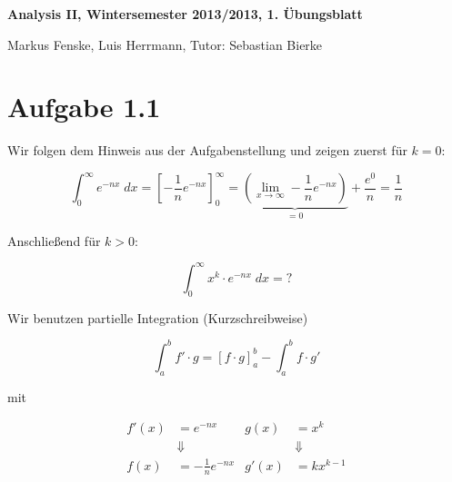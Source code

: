 \documentclass[a4paper,german,12pt,smallheadings]{scrartcl}
\begin{document}
\begin{center}
\bfseries %
\sffamily %
\vspace{-40pt}
Analysis II, Wintersemester 2013/2013, 1. Übungsblatt

Markus Fenske, Luis Herrmann, Tutor: Sebastian Bierke
\vspace{-10pt}
\end{center}

\section*{Aufgabe 1.1}

%


Wir folgen dem Hinweis aus der Aufgabenstellung und zeigen zuerst für $k=0$:

\begin{equation*}
  \int_0^\infty e^{-nx} \; dx = \left[ -\frac{1}{n} e^{-nx} \right]_0^\infty = \underbrace{\left(\lim_{x \to \infty} - \frac{1}{n} e^{-nx} \right)}_{=0} + \frac{e^0}{n} = \frac{1}{n}
\end{equation*}

Anschließend für $k > 0$:

\begin{equation*}
  \int_0^\infty x^k \cdot e^{-nx} \; dx = \text{?}
\end{equation*}

Wir benutzen partielle Integration (Kurzschreibweise)

\begin{equation*}
  \int_a^b f' \cdot g = \left[f \cdot g\right]_a^b - \int_a^b f \cdot g'
\end{equation*}

mit

\begin{align*}
  f'(x) &= e^{-nx} & g(x) &= x^k \\
        &\Downarrow & &\Downarrow\\
  f(x) &= -\frac{1}{n} e^{-nx} & g'(x) &= kx^{k-1}
\end{align*}
\end{document}
